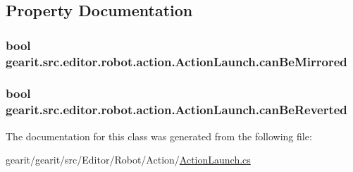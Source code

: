 \subsection{Property Documentation}
\hypertarget{classgearit_1_1src_1_1editor_1_1robot_1_1action_1_1_action_launch_a816359146587857ebb59475a25d553f6}{
\subsubsection[{can\+Be\+Mirrored}]{\setlength{\rightskip}{0pt plus 5cm}bool gearit.\+src.\+editor.\+robot.\+action.\+Action\+Launch.\+can\+Be\+Mirrored\hspace{0.3cm}{\ttfamily [get]}}}\label{classgearit_1_1src_1_1editor_1_1robot_1_1action_1_1_action_launch_a816359146587857ebb59475a25d553f6}
\hypertarget{classgearit_1_1src_1_1editor_1_1robot_1_1action_1_1_action_launch_a6f503a24a8ebb38cf80e52430a6e05c0}{
\subsubsection[{can\+Be\+Reverted}]{\setlength{\rightskip}{0pt plus 5cm}bool gearit.\+src.\+editor.\+robot.\+action.\+Action\+Launch.\+can\+Be\+Reverted\hspace{0.3cm}{\ttfamily [get]}}}\label{classgearit_1_1src_1_1editor_1_1robot_1_1action_1_1_action_launch_a6f503a24a8ebb38cf80e52430a6e05c0}


The documentation for this class was generated from the following file\+:\begin{DoxyCompactItemize}
\item 
gearit/gearit/src/\+Editor/\+Robot/\+Action/\hyperlink{_action_launch_8cs}{Action\+Launch.\+cs}\end{DoxyCompactItemize}
